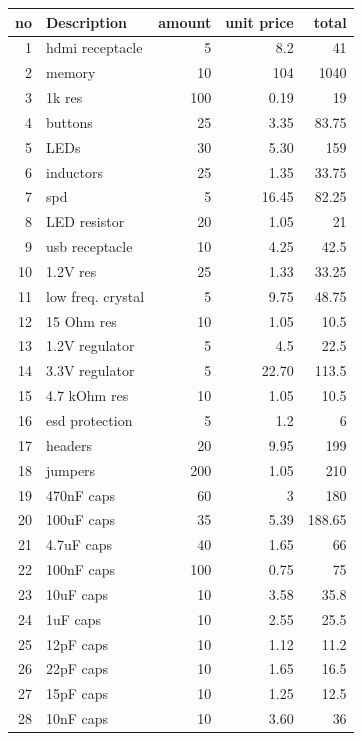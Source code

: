 \documentclass[../main/report.tex]{subfiles}
\begin{document}
\begin{table}[h]
\begin{tabular}{| r | l | r | r | r |}\hline
    no & Description  & amount & unit price & total \\\hline
    1 & hdmi receptacle  & 5  & 8.2 & 41 \\\hline
    2 & memory  & 10  & 104 & 1040 \\\hline
    3 & 1k res  & 100  & 0.19 & 19 \\\hline
    4 & buttons & 25 & 3.35 & 83.75 \\\hline
    5 & LEDs & 30 & 5.30 & 159 \\\hline
    6 & inductors & 25 & 1.35 & 33.75 \\\hline
    7 & spd & 5 & 16.45 & 82.25 \\\hline
    8 & LED resistor & 20 & 1.05 & 21 \\\hline
    9 & usb receptacle & 10 & 4.25 & 42.5 \\\hline
    10 & 1.2V res & 25 & 1.33 & 33.25 \\\hline
    11 & low freq. crystal & 5 & 9.75 & 48.75 \\\hline
    12 & 15 Ohm res & 10 & 1.05 & 10.5 \\\hline
    13 & 1.2V regulator & 5 & 4.5 & 22.5 \\\hline
    14 & 3.3V regulator & 5 & 22.70 & 113.5 \\\hline
    15 & 4.7 kOhm res & 10 & 1.05 & 10.5 \\\hline
    16 & esd protection & 5 & 1.2 & 6 \\\hline
    17 & headers & 20 & 9.95 & 199 \\\hline
    18 & jumpers & 200 & 1.05 & 210 \\\hline
    19 & 470nF caps & 60 & 3 & 180 \\\hline
    20 & 100uF caps & 35& 5.39 & 188.65 \\\hline
    21 & 4.7uF caps & 40 & 1.65 & 66 \\\hline
    22 & 100nF caps & 100 & 0.75 & 75 \\\hline
    23 & 10uF caps & 10 & 3.58 & 35.8 \\\hline
    24 & 1uF caps & 10 & 2.55 & 25.5  \\\hline
    25 & 12pF caps & 10 & 1.12 & 11.2 \\\hline 
    26 & 22pF caps & 10 & 1.65 & 16.5 \\\hline
    27 & 15pF caps & 10 & 1.25 & 12.5 \\\hline
    28 & 10nF caps & 10 & 3.60 & 36 \\\hline

\end{tabular}
\end{table}
\end{document}

